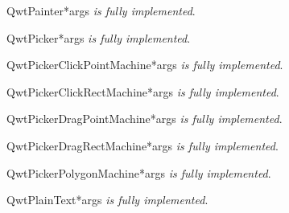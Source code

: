 \documentclass{manual}
\begin{document}
\begin{classdesc}{QwtPainter}{*args}
\emph{is fully implemented}.
\end{classdesc}

\begin{classdesc}{QwtPicker}{*args}
\emph{is fully implemented}.
\end{classdesc}

\begin{classdesc}{QwtPickerClickPointMachine}{*args}
\emph{is fully implemented}.
\end{classdesc}

\begin{classdesc}{QwtPickerClickRectMachine}{*args}
\emph{is fully implemented}.
\end{classdesc}

\begin{classdesc}{QwtPickerDragPointMachine}{*args}
\emph{is fully implemented}.
\end{classdesc}

\begin{classdesc}{QwtPickerDragRectMachine}{*args}
\emph{is fully implemented}.
\end{classdesc}

\begin{classdesc}{QwtPickerPolygonMachine}{*args}
\emph{is fully implemented}.
\end{classdesc}

\begin{classdesc}{QwtPlainText}{*args}
\emph{is fully implemented}.
\end{classdesc}
\end{document}
